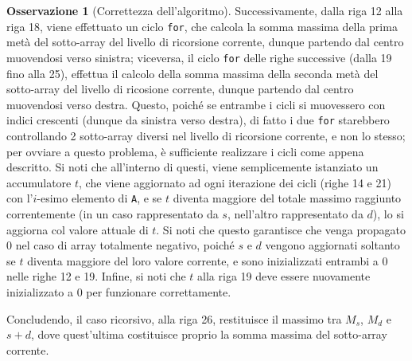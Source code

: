 \documentclass[14pt]{extreport}
\theoremstyle{definition}
\theoremstyle{definition}
\newtheorem{remark}{Osservazione}[subsection]
\begin{document}
\begin{remark}[Correttezza dell'algoritmo]
    Successivamente, dalla riga 12 alla riga 18, viene effettuato un ciclo \texttt{for}, che calcola la somma massima della prima metà del sotto-array del livello di ricorsione corrente, dunque partendo dal centro muovendosi verso sinistra; viceversa, il ciclo \texttt{for} delle righe successive (dalla 19 fino alla 25), effettua il calcolo della somma massima della seconda metà del sotto-array del livello di ricosione corrente, dunque partendo dal centro muovendosi verso destra. Questo, poiché se entrambe i cicli si muovessero con indici crescenti (dunque da sinistra verso destra), di fatto i due \texttt{for} starebbero controllando 2 sotto-array diversi nel livello di ricorsione corrente, e non lo stesso; per ovviare a questo problema, è sufficiente realizzare i cicli come appena descritto. Si noti che all'interno di questi, viene semplicemente istanziato un accumulatore $t$, che viene aggiornato ad ogni iterazione dei cicli (righe 14 e 21) con l'$i$-esimo elemento di \texttt{A}, e se $t$ diventa maggiore del totale massimo raggiunto correntemente (in un caso rappresentato da $s$, nell'altro rappresentato da $d$), lo si aggiorna col valore attuale di $t$. Si noti che questo garantisce che venga propagato 0 nel caso di array totalmente negativo, poiché $s$ e $d$ vengono aggiornati soltanto se $t$ diventa maggiore del loro valore corrente, e sono inizializzati entrambi a 0 nelle righe 12 e 19. Infine, si noti che $t$ alla riga 19 deve essere nuovamente inizializzato a 0 per funzionare correttamente.

    Concludendo, il caso ricorsivo, alla riga 26, restituisce il massimo tra $M_s$, $M_d$ e $s + d$, dove quest'ultima costituisce proprio la somma massima del sotto-array corrente.

\end{remark}
\end{document}
